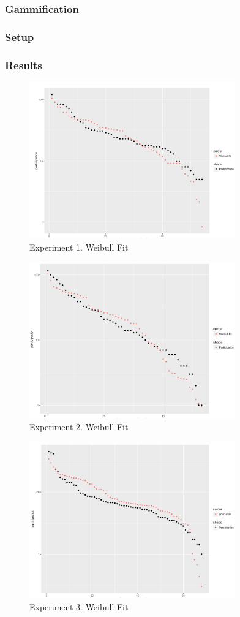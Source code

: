 \subsubsection{Gammification}

\subsubsection{Setup}
\subsubsection{Results} 

\begin{figure}[!t]
    \centering
        \includegraphics[width=3.5in]{img/weibull_1.png}
    \caption{Experiment 1. Weibull Fit}
    \label{fig:w1}
\end{figure}
\begin{figure}[!t]
    \centering
        \includegraphics[width=3.5in]{img/weibull_2.png}
    \caption{Experiment 2. Weibull Fit}
    \label{fig:w2}
\end{figure}
\begin{figure}[!t]
    \centering
        \includegraphics[width=3.5in]{img/weibull_3.png}
    \caption{Experiment 3. Weibull Fit}
    \label{fig:w3}
\end{figure}
